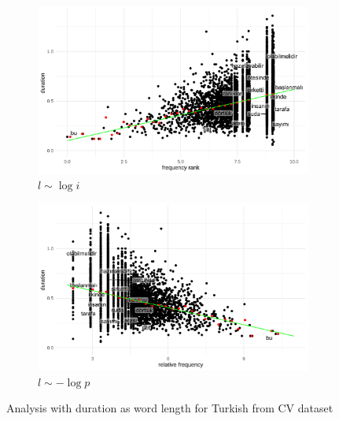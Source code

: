 \begin{figure}[H]
  \centering
  \begin{subfigure}[b]{0.48\textwidth}
    \centering
    \includegraphics[width=\textwidth]{plots/Turkish_logi_d_CV.pdf}
    \caption{$l \sim \log i$}
  \end{subfigure}
  \hfill
  \begin{subfigure}[b]{0.48\textwidth}
    \centering
    \includegraphics[width=\textwidth]{plots/Turkish_logp_d_CV.pdf}
    \caption{$l \sim -\log p$}
  \end{subfigure}
  \caption{Analysis with duration as word length for Turkish from CV dataset}
\end{figure}

